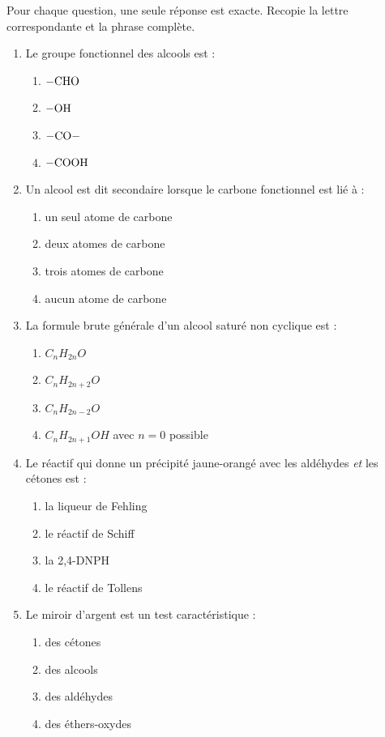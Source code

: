 \documentclass[11pt]{article}
\begin{document}
\begin{exercice}
Pour chaque question, une seule réponse est exacte. Recopie la lettre correspondante et la phrase complète.
\begin{enumerate}
\item Le groupe fonctionnel des alcools est :
\begin{enumerate}
\item $-\ce{CHO}$ \quad \item $-\ce{OH}$ \quad \item $-\ce{CO}-$ \quad \item $-\ce{COOH}$
\end{enumerate}
\item Un alcool est dit secondaire lorsque le carbone fonctionnel est lié à :
\begin{enumerate}
\item un seul atome de carbone \quad \item deux atomes de carbone \quad \item trois atomes de carbone \quad \item aucun atome de carbone
\end{enumerate}
\item La formule brute générale d'un alcool saturé non cyclique est :
\begin{enumerate}
\item $C_nH_{2n}O$ \quad \item $C_nH_{2n+2}O$ \quad \item $C_nH_{2n-2}O$ \quad \item $C_nH_{2n+1}OH$ avec $n=0$ possible
\end{enumerate}
\item Le réactif qui donne un précipité jaune-orangé avec les aldéhydes \emph{et} les cétones est :
\begin{enumerate}
\item la liqueur de Fehling \quad \item le réactif de Schiff \quad \item la 2,4-DNPH \quad \item le réactif de Tollens
\end{enumerate}
\item Le miroir d'argent est un test caractéristique :
\begin{enumerate}
\item des cétones \quad \item des alcools \quad \item des aldéhydes \quad \item des éthers-oxydes
\end{enumerate}
\end{enumerate}
\end{exercice}
\end{document}
